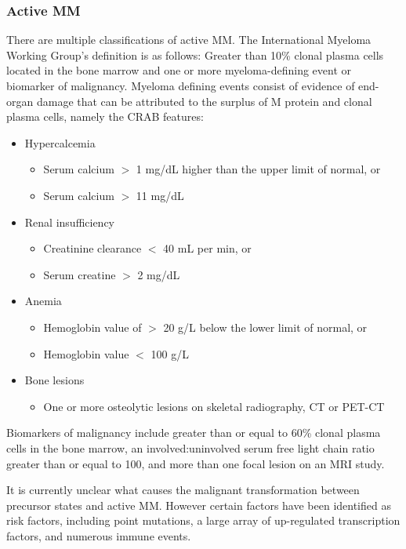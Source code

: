 \subsubsection{Active MM}
There are multiple classifications of active MM.
The International Myeloma Working Group's definition\cite{rajkumar2014international} is as follows:
Greater than 10\% clonal plasma cells located in the bone marrow and one or more myeloma-defining event or biomarker of malignancy.
Myeloma defining events consist of evidence of end-organ damage that can be attributed to the surplus of M protein and clonal plasma cells, namely the CRAB features:
%
\begin{itemize}
  \item Hypercalcemia
    \begin{itemize}
        \item Serum calcium $>$ 1 mg/dL higher than the upper limit of normal, or
        \item Serum calcium $>$ 11 mg/dL
    \end{itemize}
  \item Renal insufficiency
    \begin{itemize}
        \item Creatinine clearance $<$ 40 mL per min, or
        \item Serum creatine $>$ 2 mg/dL
  \end{itemize}
  \item Anemia
    \begin{itemize}
        \item Hemoglobin value of $>$  20 g/L below the lower limit of normal, or
        \item Hemoglobin value $<$ 100 g/L
    \end{itemize}
    \item Bone lesions
      \begin{itemize}
        \item One or more osteolytic lesions on skeletal radiography, CT or PET-CT
        \end{itemize}
\end{itemize}
%

Biomarkers of malignancy include greater than or equal to 60\% clonal plasma cells in the bone marrow, an involved:uninvolved serum free light chain ratio greater than or equal to 100, and more than one focal lesion on an MRI study\cite{rajkumar2014international}.

%
It is currently unclear what causes the malignant transformation between precursor states and active MM\@.
However certain factors have been identified as risk factors, including point mutations, a large array of up-regulated transcription factors, and numerous immune events.

